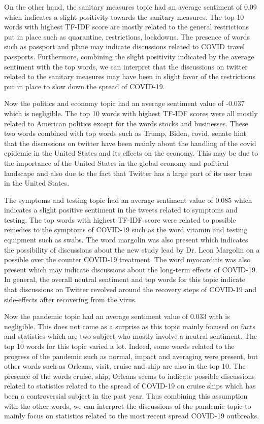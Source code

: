 \documentclass[letterpaper]{article} %
\begin{document}
On the other hand, the sanitary measures topic had an average sentiment of 0.09 which indicates a slight positivity towards the sanitary measures. The top 10 words with highest TF-IDF score are mostly related to the general restrictions put in place such as quarantine, restrictions, lockdowns. The presence of words such as passport and plane may indicate discussions related to COVID travel passports. Furthermore, combining the slight positivity indicated by the average sentiment with the top words, we can interpret that the discussions on twitter related to the sanitary measures may have been in slight favor of the restrictions put in place to slow down the spread of COVID-19.

Now the politics and economy topic had an average sentiment value of -0.037 which is negligible. The top 10 words with highest TF-IDF scores were all mostly related to American politics except for the words stocks and businesses. These two words combined with top words such as Trump, Biden, covid, senate hint that the discussions on twitter have been mainly about the handling of the covid epidemic in the United States and its effects on the economy. This may be due to the importance of the United States in the global economy and political landscape and also due to the fact that Twitter has a large part of its user base in the United States. 

The symptoms and testing topic had an average sentiment value of 0.085 which indicates a slight positive sentiment in the tweets related to symptoms and testing. The top words with highest TF-IDF score were related to possible remedies to the symptoms of COVID-19 such as the word vitamin and testing equipment such as swabs. The word margolin was also present which indicates the possibility of discussions about the new study lead by Dr. Leon Margolin on a possible over the counter COVID-19 treatment. The word myocarditis was also present which may indicate discussions about the long-term effects of COVID-19. In general, the overall neutral sentiment and top words for this topic indicate that discussions on Twitter revolved around the recovery steps of COVID-19 and side-effects after recovering from the virus.

Now the pandemic topic had an average sentiment value of 0.033 with is negligible. This does not come as a surprise as this topic mainly focused on facts and statistics which are two subject who mostly involve a neutral sentiment. The top 10 words for this topic varied a lot. Indeed, some words related to the progress of the pandemic such as normal, impact and averaging were present, but other words such as Orleans, visit, cruise and ship are also in the top 10. The presence of the words cruise, ship, Orleans seems to indicate possible discussions related to statistics related to the spread of COVID-19 on cruise ships which has been a controversial subject in the past year. Thus combining this assumption with the other words, we can interpret the discussions of the pandemic topic to mainly focus on statistics related to the most recent spread COVID-19 outbreaks.
\end{document}
